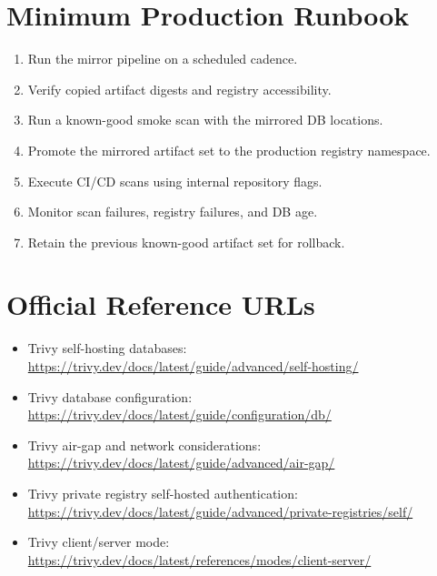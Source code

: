 \documentclass[10pt]{article}
\begin{document}
\section{Minimum Production Runbook}
\begin{enumerate}
  \item Run the mirror pipeline on a scheduled cadence.
  \item Verify copied artifact digests and registry accessibility.
  \item Run a known-good smoke scan with the mirrored DB locations.
  \item Promote the mirrored artifact set to the production registry namespace.
  \item Execute CI/CD scans using internal repository flags.
  \item Monitor scan failures, registry failures, and DB age.
  \item Retain the previous known-good artifact set for rollback.
\end{enumerate}

\section{Official Reference URLs}
{\footnotesize
\begin{itemize}
  \item Trivy self-hosting databases: \url{https://trivy.dev/docs/latest/guide/advanced/self-hosting/}
  \item Trivy database configuration: \url{https://trivy.dev/docs/latest/guide/configuration/db/}
  \item Trivy air-gap and network considerations: \url{https://trivy.dev/docs/latest/guide/advanced/air-gap/}
  \item Trivy private registry self-hosted authentication: \url{https://trivy.dev/docs/latest/guide/advanced/private-registries/self/}
  \item Trivy client/server mode: \url{https://trivy.dev/docs/latest/references/modes/client-server/}
\end{itemize}
}
\end{document}
